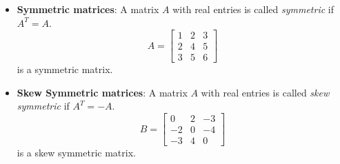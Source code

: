 \documentclass{report}
\begin{document}
\begin{itemize}
    \item \textbf{Symmetric matrices}: A matrix \( A \) with real entries is called \textit{symmetric} if \( A^T = A \).
        \[
            A = \begin{bmatrix}
                1 & 2 & 3 \\
                2 & 4 & 5 \\
                3 & 5 & 6
            \end{bmatrix}
        \]
        is a symmetric matrix.
    \item \textbf{Skew Symmetric matrices}: A matrix \( A \) with real entries is called \textit{skew symmetric} if \( A^T = -A \).
        \[
            B = \begin{bmatrix}
                0 & 2 & -3 \\
                -2 & 0 & -4 \\
                -3 & 4 & 0
            \end{bmatrix}
        \]
        is a skew symmetric matrix.
        
        

    \end{itemize}

    \pagebreak 
\end{document}
